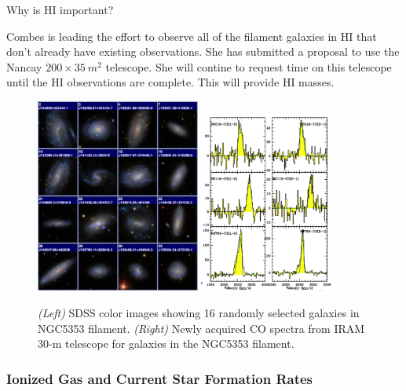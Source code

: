 \documentclass[11pt, preprint]{aastex}
\newcommand{\ha}{$H\alpha$}
\begin{document}
Why is HI important?

Combes is leading the effort to observe all of the filament galaxies
in HI that don't already have existing observations.  She has
submitted a proposal to use the Nancay $200 \times 35~m^2$ telescope.
She will contine to request time on this telescope until the HI
observations are complete.  This will provide HI masses.

\begin{figure}[h]
\centering
\includegraphics[width=0.48\textwidth]{sdss-montage.png}
\includegraphics[width=0.4\textwidth]{CO-detection.png}
\caption{\small {\it (Left)} SDSS color images showing 16 randomly
  selected galaxies in NGC5353 filament.  {\it (Right)} Newly acquired
  CO spectra
  from IRAM 30-m telescope for galaxies in the NGC5353 filament.  }
\label{sdssCO}
\end{figure}


\vspace*{-1cm}
\subsubsection{Ionized Gas and Current Star Formation Rates}
\vspace*{-.3cm}
\end{document}

